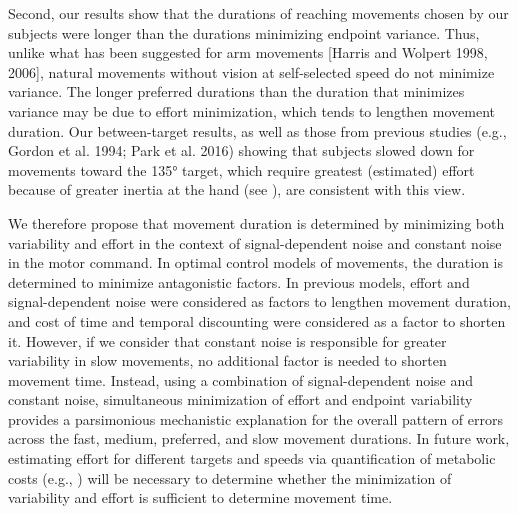 Second, our results show that the durations of reaching movements chosen by our subjects were longer than the durations minimizing endpoint variance. Thus, unlike what has been suggested for arm movements [Harris and Wolpert 1998, 2006], natural movements without vision at self-selected speed do not minimize variance. The longer preferred durations than the duration that minimizes variance may be due to effort minimization, which tends to lengthen movement duration. Our between-target results, as well as those from previous studies (e.g., Gordon et al. 1994; Park et al. 2016) showing that subjects slowed down for movements toward the \ang{135} target, which require greatest (estimated) effort because of greater inertia at the hand (see \cite{Schweighofer2015}), are consistent with this view.

We therefore propose that movement duration is determined by minimizing both variability and effort in the context of signal-dependent noise and constant noise in the motor command. In optimal control models of movements, the duration is determined to minimize antagonistic factors. In previous models, effort and signal-dependent noise were considered as factors to lengthen movement duration, and cost of time \cite{Hoff1994} and temporal discounting \cite{Haith2012, Rigoux2012, Shadmehr2010} were considered as a factor to shorten it. However, if we consider that constant noise is responsible for greater variability in slow movements, no additional factor is needed to shorten movement time. Instead, using a combination of signal-dependent noise and constant noise, simultaneous minimization of effort and endpoint variability provides a parsimonious mechanistic explanation for the overall pattern of errors across the fast, medium, preferred, and slow movement durations. In future work, estimating effort for different targets and speeds via quantification of metabolic costs (e.g., \cite{Huang2012}) will be necessary to determine whether the minimization of variability and effort is sufficient to determine movement time.

